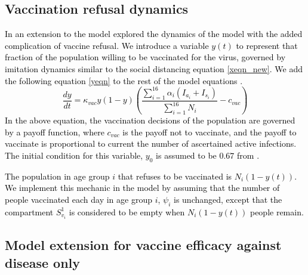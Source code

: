 \subsection{Vaccination refusal dynamics}
\textcolor{black}{In an extension to the model explored the dynamics of the model with the added complication of vaccine refusal. We introduce a variable $y(t)$ to represent that fraction of the population willing to be vaccinated for the virus, governed by imitation dynamics similar to the social distancing equation \ref{xeqn_new}. We add the following equation \ref{yeqn} to the rest of the model equations \cite{bauch2005imitation, bauch2012evolutionary}.
\begin{equation}
    \frac{d y}{dt} = \kappa_{vac} y(1 - y)\left(\frac{\sum_{i=1}^{16}\alpha_i(I_{a_i} + I_{s_i})}{\sum_{i=1}^{16} N_i} - c_{vac}\right)
    \label{yeqn}
\end{equation}
In the above equation, the vaccination decisions of the population are governed by a payoff function, where $c_{vac}$ is the payoff not to vaccinate, and the payoff to vaccinate is proportional to current the number of ascertained active infections. The initial condition for this variable, $y_0$ is assumed to be $0.67$ from \cite{MALIK2020100495}.}

\textcolor{black}{The population in age group $i$ that refuses to be vaccinated is $N_i (1 - y(t))$. We implement this mechanic in the model by assuming that the number of people vaccinated each day in age group $i$, $\psi_i$ is unchanged, except that the compartment $S_{v_i}^1$ is considered to be empty when $N_i (1 - y(t))$ people remain.}


\subsection{Model extension for vaccine efficacy against disease only}

